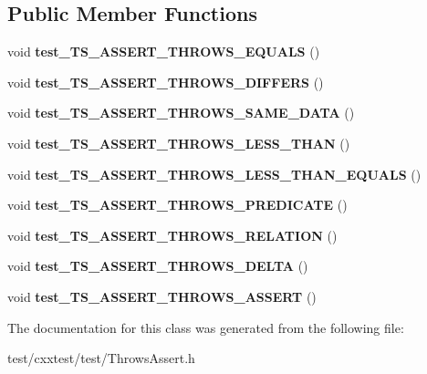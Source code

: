 \subsection*{Public Member Functions}
\begin{DoxyCompactItemize}
\item 
\hypertarget{classThrowsAssert_abc7cab1ad55016062890ad82646a8fc9}{void {\bfseries test\-\_\-\-T\-S\-\_\-\-A\-S\-S\-E\-R\-T\-\_\-\-T\-H\-R\-O\-W\-S\-\_\-\-E\-Q\-U\-A\-L\-S} ()}\label{classThrowsAssert_abc7cab1ad55016062890ad82646a8fc9}

\item 
\hypertarget{classThrowsAssert_aba7b9a281ba8a1aca4e915e31b6a28f6}{void {\bfseries test\-\_\-\-T\-S\-\_\-\-A\-S\-S\-E\-R\-T\-\_\-\-T\-H\-R\-O\-W\-S\-\_\-\-D\-I\-F\-F\-E\-R\-S} ()}\label{classThrowsAssert_aba7b9a281ba8a1aca4e915e31b6a28f6}

\item 
\hypertarget{classThrowsAssert_af25f21d0aace9dec4ebc9c334fd3b828}{void {\bfseries test\-\_\-\-T\-S\-\_\-\-A\-S\-S\-E\-R\-T\-\_\-\-T\-H\-R\-O\-W\-S\-\_\-\-S\-A\-M\-E\-\_\-\-D\-A\-T\-A} ()}\label{classThrowsAssert_af25f21d0aace9dec4ebc9c334fd3b828}

\item 
\hypertarget{classThrowsAssert_a176c8ceecf36d330bfbd6e29b3f9cf01}{void {\bfseries test\-\_\-\-T\-S\-\_\-\-A\-S\-S\-E\-R\-T\-\_\-\-T\-H\-R\-O\-W\-S\-\_\-\-L\-E\-S\-S\-\_\-\-T\-H\-A\-N} ()}\label{classThrowsAssert_a176c8ceecf36d330bfbd6e29b3f9cf01}

\item 
\hypertarget{classThrowsAssert_a941c712cd434d77f590ef4560adb2b6e}{void {\bfseries test\-\_\-\-T\-S\-\_\-\-A\-S\-S\-E\-R\-T\-\_\-\-T\-H\-R\-O\-W\-S\-\_\-\-L\-E\-S\-S\-\_\-\-T\-H\-A\-N\-\_\-\-E\-Q\-U\-A\-L\-S} ()}\label{classThrowsAssert_a941c712cd434d77f590ef4560adb2b6e}

\item 
\hypertarget{classThrowsAssert_a4835b95854655257ae283f42b4871815}{void {\bfseries test\-\_\-\-T\-S\-\_\-\-A\-S\-S\-E\-R\-T\-\_\-\-T\-H\-R\-O\-W\-S\-\_\-\-P\-R\-E\-D\-I\-C\-A\-T\-E} ()}\label{classThrowsAssert_a4835b95854655257ae283f42b4871815}

\item 
\hypertarget{classThrowsAssert_aadfe0d5aeaeac750d7e46bda228a573a}{void {\bfseries test\-\_\-\-T\-S\-\_\-\-A\-S\-S\-E\-R\-T\-\_\-\-T\-H\-R\-O\-W\-S\-\_\-\-R\-E\-L\-A\-T\-I\-O\-N} ()}\label{classThrowsAssert_aadfe0d5aeaeac750d7e46bda228a573a}

\item 
\hypertarget{classThrowsAssert_abdc29d9a82625ad9cc0abd883cdea24f}{void {\bfseries test\-\_\-\-T\-S\-\_\-\-A\-S\-S\-E\-R\-T\-\_\-\-T\-H\-R\-O\-W\-S\-\_\-\-D\-E\-L\-T\-A} ()}\label{classThrowsAssert_abdc29d9a82625ad9cc0abd883cdea24f}

\item 
\hypertarget{classThrowsAssert_a1163a99017e637942473ae8c21ba1d4d}{void {\bfseries test\-\_\-\-T\-S\-\_\-\-A\-S\-S\-E\-R\-T\-\_\-\-T\-H\-R\-O\-W\-S\-\_\-\-A\-S\-S\-E\-R\-T} ()}\label{classThrowsAssert_a1163a99017e637942473ae8c21ba1d4d}

\end{DoxyCompactItemize}


The documentation for this class was generated from the following file\-:\begin{DoxyCompactItemize}
\item 
test/cxxtest/test/Throws\-Assert.\-h\end{DoxyCompactItemize}
